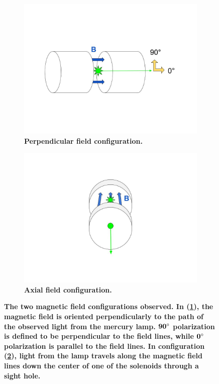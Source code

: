 \documentclass[twocolumn]{article}
\begin{document}
	
	\begin{figure}
		\centering
		\begin{subfigure}{0.55\textwidth}
			\includegraphics[width = 1.0\textwidth]{Images/FieldConfigA.jpg}
			\caption{\textbf{Perpendicular field configuration.}}
			\label{subfig:PerpFieldConfig}
		\end{subfigure}%
		\begin{subfigure}{0.55\textwidth}
			\centering
			\includegraphics[width=1.0\textwidth]{Images/FieldConfigB.jpg}
			\caption{\textbf{Axial field configuration.}}
			\label{subfig:AxialFieldConfig}
		\end{subfigure}%
		\caption{\textbf{The two magnetic field configurations observed. In (\ref{subfig:PerpFieldConfig}), the magnetic field is oriented perpendicularly to the path of the observed light from the mercury lamp. $\mathbf{90\degree}$ polarization is defined to be perpendicular to the field lines, while $\mathbf{0\degree}$ polarization is parallel to the field lines. In configuration (\ref{subfig:AxialFieldConfig}), light from the lamp travels along the magnetic field lines down the center of one of the solenoids through a sight hole.}}
		\label{fig:FieldConfig}
	\end{figure}
	
\end{document}
